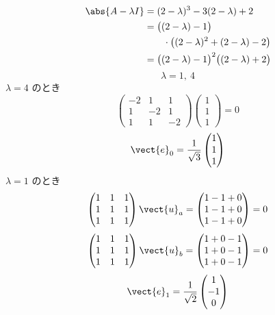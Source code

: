 \begin{align*}
\abs{A-\lambda I}&=(2-\lambda)^{3}-3(2-\lambda)+2\\
&=\bigl((2-\lambda)-1\bigr)\\
&\qquad\cdot\bigl((2-\lambda)^{2}+(2-\lambda)-2\bigr)\\
&=\bigl((2-\lambda)-1\bigr)^{2}\bigl((2-\lambda)+2\bigr)
\end{align*}
\[ \lambda=1,\ 4 \]
$\lambda=4$ のとき
\[ \begin{pmatrix}-2&1&1\\1&-2&1\\1&1&-2\end{pmatrix}\begin{pmatrix}1\\1\\1\end{pmatrix}=0 \]
\[ \vect{e}_{0}=\frac{1}{\sqrt{3}}\begin{pmatrix}1\\1\\1\end{pmatrix} \]
$\lambda=1$ のとき
\[ \begin{pmatrix}1&1&1\\1&1&1\\1&1&1\end{pmatrix}\vect{u}_{a}=\begin{pmatrix}1-1+0\\1-1+0\\1-1+0\end{pmatrix}=0 \]
\[ \begin{pmatrix}1&1&1\\1&1&1\\1&1&1\end{pmatrix}\vect{u}_{b}=\begin{pmatrix}1+0-1\\1+0-1\\1+0-1\end{pmatrix}=0 \]
\[ \vect{e}_{1}=\frac{1}{\sqrt{2}}\begin{pmatrix}1\\-1\\0\end{pmatrix} \]
